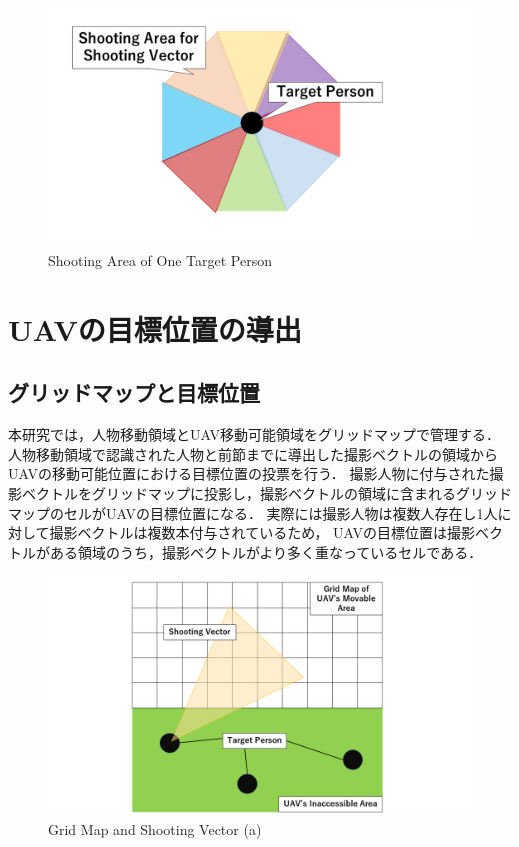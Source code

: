 \documentclass[autodetect-engine,dvipdfmx-if-dvi,ja=standard,a4j,jbase=11pt,magstyle=nomag*]{bxjsreport}
\begin{document}
\begin{figure}[b]
    \centering
    \includegraphics[width=\linewidth, clip]{./figure/chapter2/shooting_area.png}
    \caption{Shooting Area of One Target Person}
    \label{fig:shoot_area}
\end{figure}

\section{UAVの目標位置の導出}
\subsection{グリッドマップと目標位置}
本研究では，人物移動領域とUAV移動可能領域をグリッドマップで管理する．
人物移動領域で認識された人物と前節までに導出した撮影ベクトルの領域からUAVの移動可能位置における目標位置の投票を行う．
撮影人物に付与された撮影ベクトルをグリッドマップに投影し，撮影ベクトルの領域に含まれるグリッドマップのセルがUAVの目標位置になる．
実際には撮影人物は複数人存在し1人に対して撮影ベクトルは複数本付与されているため，
UAVの目標位置は撮影ベクトルがある領域のうち，撮影ベクトルがより多く重なっているセルである．

\begin{figure}[p]
    \centering
    \includegraphics[width=\linewidth, clip]{./figure/chapter2/NSV_1.png}
    \caption{Grid Map and Shooting Vector (a)}
    \label{fig:nsv1}
\end{figure}
\end{document}
